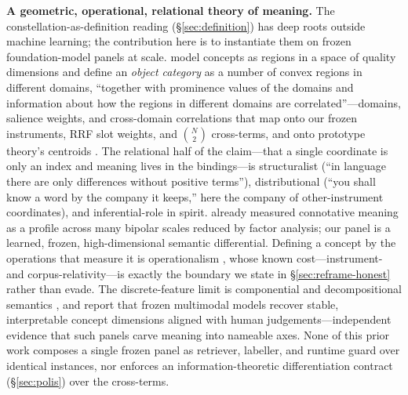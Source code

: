 \documentclass[10pt,twocolumn]{article}
\begin{document}
\textbf{A geometric, operational, relational theory of meaning.} The
constellation-as-definition reading (\S\ref{sec:definition}) has deep roots
outside machine learning; the contribution here is to instantiate them on frozen
foundation-model panels at scale. \citet{gardenfors2000conceptual,
gardenfors2014geometry} model concepts as regions in a space of quality
dimensions and define an \emph{object category} as a number of convex regions in
different domains, ``together with prominence values of the domains and
information about how the regions in different domains are correlated''---domains,
salience weights, and cross-domain correlations that map onto our frozen
instruments, RRF slot weights, and $\binom{N}{2}$ cross-terms, and onto prototype
theory's centroids \citep{rosch1975cognitive}. The relational half of the
claim---that a single coordinate is only an index and meaning lives in the
bindings---is structuralist \citep{saussure1916cours} (``in language there are
only differences without positive terms''), distributional
\citep{firth1957synopsis} (``you shall know a word by the company it keeps,''
here the company of other-instrument coordinates), and inferential-role
\citep{block1986advertisement} in spirit. \citet{osgood1957measurement} already
measured connotative meaning as a profile across many bipolar scales reduced by
factor analysis; our panel is a learned, frozen, high-dimensional semantic
differential. Defining a concept by the operations that measure it is
operationalism \citep{bridgman1927logic}, whose known cost---instrument- and
corpus-relativity---is exactly the boundary we state in \S\ref{sec:reframe-honest}
rather than evade. The discrete-feature limit is componential and decompositional
semantics \citep{katz1963structure, white2016universal}, and
\citet{du2025humanlike} report that frozen multimodal models recover stable,
interpretable concept dimensions aligned with human judgements---independent
evidence that such panels carve meaning into nameable axes. None of this prior
work composes a single frozen panel as retriever, labeller, and runtime guard
over identical instances, nor enforces an information-theoretic differentiation
contract (\S\ref{sec:polis}) over the cross-terms.
\end{document}
